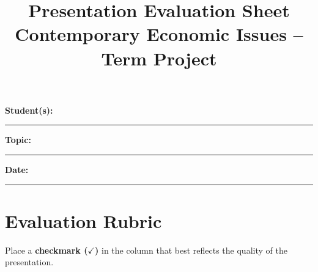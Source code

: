 \documentclass[12pt]{article}
\title{\textbf{Presentation Evaluation Sheet}\\
Contemporary Economic Issues -- Term Project}
\date{}
\begin{document}
\maketitle

\noindent\textbf{Student(s):} \rule{7cm}{0.4pt}

\vspace{0.3cm}

\noindent\textbf{Topic:} \rule{9cm}{0.4pt}

\vspace{0.3cm}

\noindent\textbf{Date:} \rule{4cm}{0.4pt}

\vspace{0.5cm}

\section*{Evaluation Rubric}

Place a \textbf{checkmark ($\checkmark$)} in the column that best reflects the quality of the presentation.

\bigskip
\end{document}
